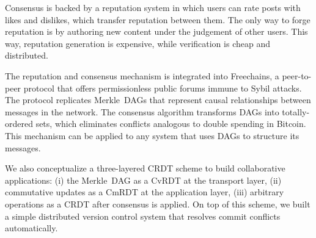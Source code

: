 \documentclass[10pt,journal,compsoc]{IEEEtran}
\newcommand{\FC}       {Freechains\xspace}
\newcommand{\reps}     {\emph{reps}\xspace}
\begin{document}
Consensus is backed by a reputation system in which users can rate posts with
likes and dislikes, which transfer reputation between them.
The only way to forge reputation is by authoring new content under the
judgement of other users.
This way, reputation generation is expensive, while verification is cheap and
distributed.

The reputation and consensus mechanism is integrated into \FC, a peer-to-peer
protocol that offers permissionless public forums immune to Sybil attacks.
The protocol replicates Merkle~DAGs that represent causal relationships between
messages in the network.
The consensus algorithm transforms DAGs into totally-ordered sets, which
eliminates conflicts analogous to double spending in Bitcoin.
This mechanism can be applied to any system that uses DAGs to structure its
messages.

We also conceptualize a three-layered CRDT scheme to build collaborative
applications:
    (i)   the Merkle~DAG as a CvRDT at the transport layer,
    (ii)  commutative updates as a CmRDT at the application layer,
    (iii) arbitrary operations as a CRDT after consensus is applied.
%
On top of this scheme, we built a simple distributed version control system
that resolves commit conflicts automatically.

\end{document}
